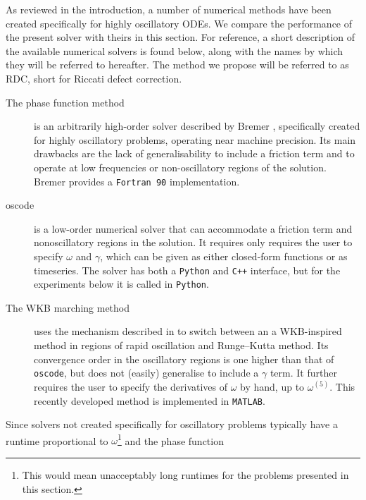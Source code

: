 \documentclass[10pt]{article}
\newcommand{\om}{\omega}
\newcommand{\g}{\gamma}
\newcommand{\AB}[1]{{\color{orange}#1}}
\begin{document}
As reviewed in the introduction, a number of numerical methods have been
created specifically for highly oscillatory ODEs. We compare the performance of
the present solver with theirs in this section. For reference, a short
description of the available numerical solvers is found below, along with the
names by which they will be referred to hereafter. The method we propose will
be referred to as RDC, short for Riccati defect correction.
%
\begin{description}
\item[The %
  phase function method]{is an arbitrarily high-order solver
        described by Bremer \cite{bremer2018}, specifically created for highly
        oscillatory problems, operating near machine precision. Its main
        drawbacks are the lack of generalisability to include a friction term
        and to operate at low frequencies or non-oscillatory regions of the
        solution. Bremer provides a \texttt{Fortran 90} implementation.
        }
\item[oscode]   %
{is a low-order numerical solver
        \cite{agocs2020efficient,agocs2020dense} that can accommodate a
        friction term and nonoscillatory regions in the solution. It requires
        only requires the user to specify $\om$ and $\g$, which can be given as
        either closed-form functions or as timeseries. The solver has both a
        \texttt{Python} and \texttt{C++} interface, but for the experiments below it is called in
        \texttt{Python}.}
    \item[The WKB marching method]{\cite{arnold2011wkb,korner2022wkb} uses the
        mechanism described in \cite{agocs2020efficient} to switch between an a
        WKB-inspired method in regions of rapid oscillation and Runge--Kutta
        method. Its convergence order in the oscillatory regions is one higher
        than that of \texttt{oscode}, but does not (easily) generalise to
        include a $\g$ term. It further requires the user to specify the
        derivatives of $\om$ by hand, up to $\om^{(5)}$. This recently
        developed method is implemented in \texttt{MATLAB}.
    }
\end{description}
%
Since solvers not created specifically for oscillatory problems typically have
a runtime proportional to $\om$\footnote{This would mean unacceptably long
runtimes for the problems presented in this section.} and the phase function
\end{document}
